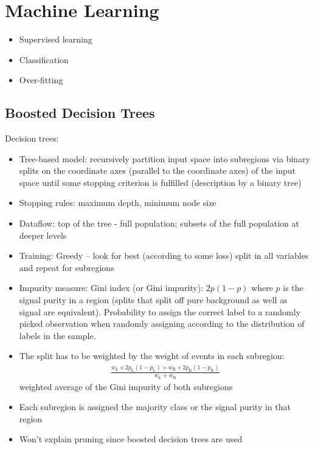 \chapter{Machine Learning}
\label{sec:ml}

\begin{itemize}
\item Supervised learning
\item Classification
\item Over-fitting
\end{itemize}

\section{Boosted Decision Trees}
\label{sec:bdt}


Decision trees:
\begin{itemize}
\item Tree-based model: recursively partition input space into subregions via
  binary splits on the coordinate axes (parallel to the coordinate axes) of the
  input space until some stopping criterion is fulfilled (description by a
  binary tree)
\item Stopping rules: maximum depth, minimum node size
\item Dataflow: top of the tree - full population; subsets of the full
  population at deeper levels
\item Training: Greedy -- look for best (according to some loss) split in all
  variables and repeat for subregions
\item Impurity measure: Gini index (or Gini impurity): $2 p (1 - p)$ where $p$
  is the signal purity in a region (splits that split off pure background as
  well as signal are equivalent). Probability to assign the correct label to a
  randomly picked observation when randomly assigning according to the
  distribution of labels in the sample.
\item The split has to be weighted by the weight of events in each subregion:
  \begin{align*}
    \frac{w_\mathrm{L} \times 2 p_\mathrm{L} (1 - p_\mathrm{L}) + w_\mathrm{R} \times 2 p_\mathrm{R} (1 - p_\mathrm{R})}{w_\mathrm{L} + w_\mathrm{R}}
  \end{align*}
  weighted average of the Gini impurity of both subregions
\item Each subregion is assigned the majority class or the signal purity in that region
\item Won't explain pruning since boosted decision trees are used
\end{itemize}


